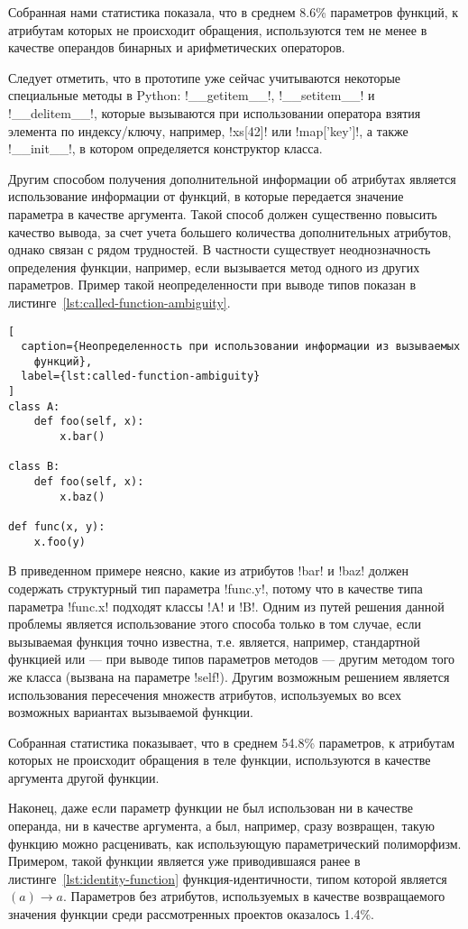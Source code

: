 Собранная нами статистика показала, что в среднем 8.6\% параметров функций, к
атрибутам которых не происходит обращения, используются тем не менее в качестве
операндов бинарных и арифметических операторов.

Следует отметить, что в прототипе уже сейчас учитываются некоторые специальные
методы в Python: !__getitem__!, !__setitem__! и !__delitem__!,
которые вызываются при использовании оператора взятия элемента по индексу/ключу,
например, !xs[42]! или !map['key']!, а также !__init__!, в котором определяется
конструктор класса.

Другим способом получения дополнительной информации об атрибутах является
использование информации от функций, в которые передается значение параметра в
качестве аргумента. Такой способ должен существенно повысить качество вывода, за
счет учета большего количества дополнительных атрибутов, однако связан с рядом
трудностей. В частности существует неоднозначность определения функции,
например, если вызывается метод одного из других параметров. Пример такой
неопределенности при выводе типов показан в
листинге~\ref{lst:called-function-ambiguity}.

\begin{lstlisting}[
  caption={Неопределенность при использовании информации из вызываемых
    функций},
  label={lst:called-function-ambiguity}
]
class A:
    def foo(self, x):
        x.bar()

class B:
    def foo(self, x):
        x.baz()

def func(x, y):
    x.foo(y)
\end{lstlisting}

В приведенном примере неясно, какие из атрибутов !bar! и !baz! должен содержать
структурный тип параметра !func.y!, потому что в качестве типа параметра
!func.x! подходят классы !A! и !B!. Одним из путей решения данной проблемы
является использование этого способа только в том случае, если вызываемая функция точно
известна, т.е. является, например, стандартной функцией или --- при выводе
типов параметров методов --- другим методом того же класса (вызвана на параметре
!self!). Другим возможным решением является использования пересечения множеств
атрибутов, используемых во всех возможных вариантах вызываемой функции.

Собранная статистика показывает, что в среднем 54.8\% параметров, к атрибутам
которых не происходит обращения в теле функции, используются в качестве
аргумента другой функции.

Наконец, даже если параметр функции не был использован ни в качестве операнда,
ни в качестве аргумента, а был, например, сразу возвращен, такую функцию можно
расценивать, как использующую параметрический
полиморфизм. Примером, такой функции является уже приводившаяся ранее в
листинге~\ref{lst:identity-function} функция-идентичности, типом которой
является $(a) \rightarrow a$. Параметров без атрибутов, используемых в качестве
возвращаемого значения функции среди рассмотренных проектов оказалось 1.4\%.

